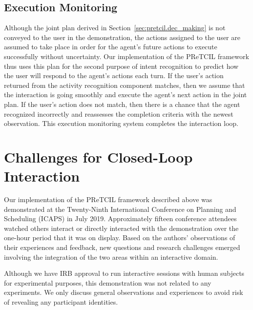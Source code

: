 \documentclass[letterpaper]{article} %
\begin{document}
\subsection{Execution Monitoring\label{sec:pretcil.exec_monitor}}
Although the joint plan derived in Section~\ref{sec:pretcil.dec_making} is not conveyed to the user in the demonstration, the actions assigned to the user are assumed to take place in order for the agent's future actions to execute successfully without uncertainty.  Our implementation of the {\sc PReTCIL} framework thus uses this plan for the second purpose of intent recognition to predict how the user will respond to the agent's actions each turn.  If the user's action returned from the activity recognition component matches, then we assume that the interaction is going smoothly and execute the agent's next action in the joint plan.  If the user's action does not match, then there is a chance that the agent recognized incorrectly and reassesses the %
completion criteria with the newest observation.  This execution monitoring system completes the interaction loop.%

\section{Challenges for Closed-Loop Interaction \label{sec:challenges}}
Our implementation of the {\sc PReTCIL} framework described above was demonstrated at the Twenty-Ninth International Conference on Planning and Scheduling (ICAPS) in July 2019.  Approximately fifteen conference attendees watched others interact or directly interacted with the demonstration over the one-hour period that it was on display.  Based on the authors' observations of their experiences and feedback, new questions and research challenges emerged involving the integration of the two areas within an interactive domain.

Although we have IRB approval to run interactive sessions with human subjects for experimental purposes, this demonstration was not related to any experiments. %
We %
only discuss general observations and experiences to avoid risk of revealing any participant identities.
\end{document}
